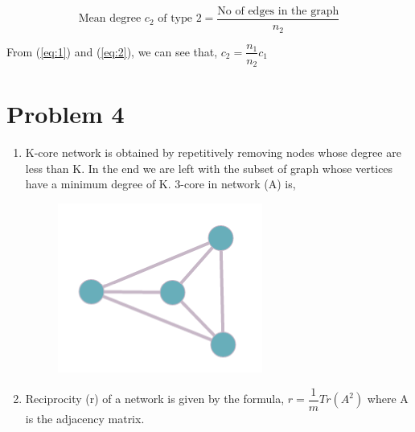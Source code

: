 \documentclass{article}
\begin{document}
\begin{equation} \label{eq:2}
\text{Mean degree } c_2 \text{ of type 2} = \dfrac{\text{No of edges in the graph}}{n_2}
\end{equation}

\begin{center}
From (\ref{eq:1}) and (\ref{eq:2}), we can see that, $c_2 = \dfrac{n_1}{n_2} c_1$ 
\end{center}


\section*{Problem 4}
\begin{enumerate}[label=(\alph*)]
\item
K-core network is obtained by repetitively removing nodes whose degree are less than K. In the end we are left with the subset of graph whose vertices have a minimum degree of K. 3-core in network (A) is, 
\begin{figure}[!h]
  \centering
  \begin{minipage}[b]{0.3\textwidth}
    \includegraphics[width=\textwidth]{images/4a1.png}
  \end{minipage}
\end{figure}

\item
Reciprocity (r) of a network is given by the formula,
$ r = \dfrac{1}{m} Tr(A^2)$
where A is the adjacency matrix.\\


\end{enumerate}
\end{document}
